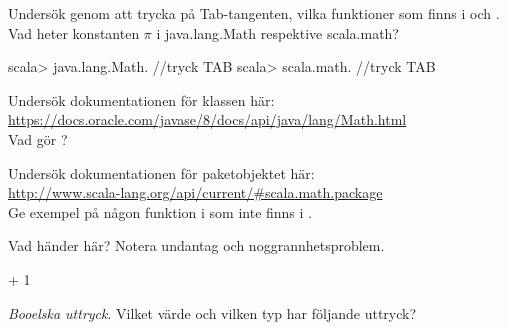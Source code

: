 {{{{\Subtask Undersök genom att trycka på Tab-tangenten, vilka funktioner som finns i  och . Vad heter konstanten $\pi$ i java.lang.Math respektive scala.math?

\begin{REPL}
scala> java.lang.Math.    //tryck TAB
scala> scala.math.        //tryck TAB
\end{REPL}

\Subtask Undersök dokumentationen för klassen  här: \\ \url{https://docs.oracle.com/javase/8/docs/api/java/lang/Math.html} \\
Vad gör ?

\Subtask Undersök dokumentationen för paketobjektet  här: \\
\url{http://www.scala-lang.org/api/current/#scala.math.package} \\
Ge exempel på någon funktion i  som inte finns i .


\Task Vad händer här? Notera undantag  och noggrannhetsproblem. %

\Subtask {} + 1

\Subtask {}

\Subtask {}

\Subtask {}

\Subtask {}

\Subtask {}

\Subtask {}

\Subtask {}

\Subtask {}

\Subtask {}


\Task \textit{Booelska uttryck}. Vilket värde och vilken typ har följande uttryck?  %

\Subtask {}

\Subtask {}

\Subtask {}

\Subtask {}

\Subtask {}

\Subtask {}

}}}}
